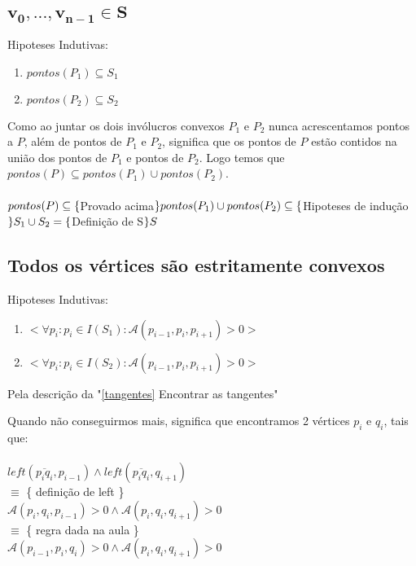 \documentclass[11pt]{article}
\begin{document}
\subsection{$\mathbf{v_0,...,v_{n-1} \in S}$}

Hipoteses Indutivas:
\begin{enumerate}
    \item $pontos(P_1) \subseteq S_1$
    \item $pontos(P_2) \subseteq S_2$
\end{enumerate}
Como ao juntar os dois invólucros convexos $P_1$ e $P_2$
nunca acrescentamos pontos a $P$, além de pontos de $P_1$ e $P_2$, 
significa que os pontos de $P$ estão contidos na 
união dos pontos de $P_1$ e pontos de $P_2$.
Logo temos que $pontos(P) \subseteq pontos(P_1) \cup pontos(P_2)$.\\ \\
$pontos(P) \\
\subseteq \{$Provado acima$\}\\
pontos(P_1) \cup pontos(P_2) \\
\subseteq \{$Hipoteses de indução$\} \\
S_1 \cup S_2 \\
= \{$Definição de S$\}\\
S$


\subsection{Todos os vértices são estritamente convexos}

Hipoteses Indutivas:
\begin{enumerate}
    \item $< \forall p_i : p_i \in I(S_1) : \mathcal{A}(p_{i-1}, p_i, p_{i+1}) > 0 >$
    \item $< \forall p_i : p_i \in I(S_2) : \mathcal{A}(p_{i-1}, p_i, p_{i+1}) > 0 >$
\end{enumerate}


Pela descrição da "\ref{tangentes} Encontrar as tangentes"
\par

Quando não conseguirmos mais, significa que encontramos 2 vértices 
$p_i$ e $q_i$, tais que:\\
\\
$left(\overline{p_i q_i}, p_{i-1}) \wedge left(\overline{p_i q_i}, q_{i+1})$\\
$\equiv$ \{ definição de left \}\\
$\mathcal{A}(p_i, q_i, p_{i-1}) > 0 \wedge \mathcal{A}(p_i, q_i, q_{i+1}) > 0$\\
$\equiv$ \{ regra dada na aula \}\\
$\mathcal{A}(p_{i-1}, p_i, q_i) > 0 \wedge \mathcal{A}(p_i, q_i, q_{i+1}) > 0$\\
\end{document}
